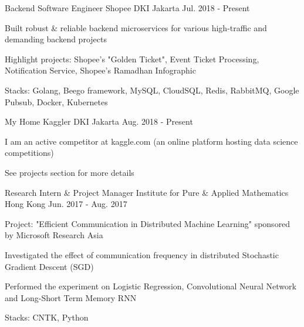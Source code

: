 

\begin{cventries}

  \cventry
    {Backend Software Engineer} %
    {Shopee} %
    {DKI Jakarta} %
    {Jul. 2018 - Present} %
    {
      \begin{cvitems} %
        \item {Built robust \& reliable backend microservices for various high-traffic and demanding backend projects}
        \item {Highlight projects: Shopee's "Golden Ticket", Event Ticket Processing, Notification Service, Shopee's Ramadhan Infographic}
        \item {Stacks: Golang, Beego framework, MySQL, CloudSQL, Redis, RabbitMQ, Google Pubsub, Docker, Kubernetes}
      \end{cvitems}
    }

  \cventry
    {My Home} %
    {Kaggler} %
    {DKI Jakarta} %
    {Aug. 2018 - Present} %
    {
      \begin{cvitems} %
        \item {I am an active competitor at kaggle.com (an online platform hosting data science competitions)}
        \item {See projects section for more details}
      \end{cvitems}
    }


  \cventry
    {Research Intern \& Project Manager} %
    {Institute for Pure \& Applied Mathematics} %
    {Hong Kong} %
    {Jun. 2017 - Aug. 2017} %
    {
      \begin{cvitems} %
        \item {Project: "Efficient Communication in Distributed Machine Learning" sponsored by Microsoft Research Asia}
        \item {Investigated the effect of communication frequency in distributed Stochastic Gradient Descent (SGD)}
        \item {Performed the experiment on Logistic Regression, Convolutional Neural Network and Long-Short Term Memory RNN}
        \item {Stacks: CNTK, Python}
      \end{cvitems}
    }


\end{cventries}
